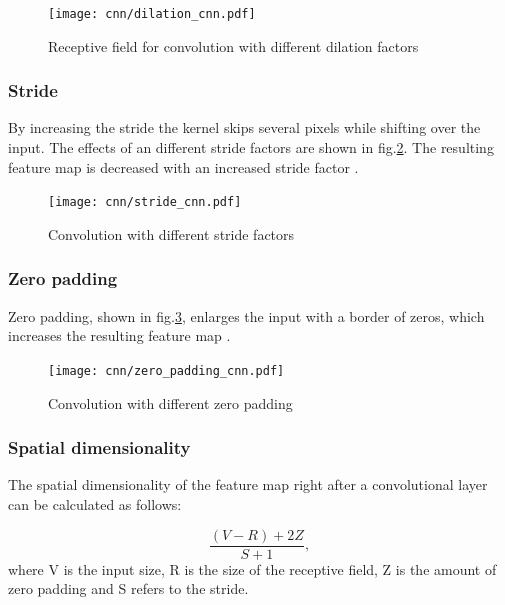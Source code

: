 \begin{figure}[htpb!]
  \centering
  \texttt{[image: cnn/dilation\_cnn.pdf]}
  \caption {Receptive field for convolution with different dilation factors}
  \label{fig:dilated_cnn}
\end{figure}
\FloatBarrier 

\subsubsection{Stride}
By increasing the stride the kernel skips several pixels while shifting over the input. The effects of an different stride factors are shown in fig.\ref{fig:stride_cnn}. The resulting feature map is decreased with an increased stride factor \cite{OShea2015}.

\begin{figure}[htpb]
  \centering
  \texttt{[image: cnn/stride\_cnn.pdf]}
  \caption {Convolution with different stride factors}
  \label{fig:stride_cnn}
\end{figure}
\FloatBarrier 

\subsubsection{Zero padding}
Zero padding, shown in fig.\ref{fig:zero_padding_cnn}, enlarges the input with a border of zeros, which increases the resulting feature map \cite{OShea2015}.

\begin{figure}[htpb]
  \centering
  \texttt{[image: cnn/zero\_padding\_cnn.pdf]}
  \caption {Convolution with different zero padding}
  \label{fig:zero_padding_cnn}
\end{figure}
\FloatBarrier 


\subsubsection{Spatial dimensionality}

 The spatial dimensionality of the feature map right after a convolutional layer can be calculated as follows:

\begin{equation}
  \frac{(V-R)+2Z}{S+1}, 
  \label{eq:spatial_dimensionality_cnn_feature map}
\end{equation}
where V is the input size, R is the size of the receptive field, Z is the amount of zero padding and S refers to the stride.

